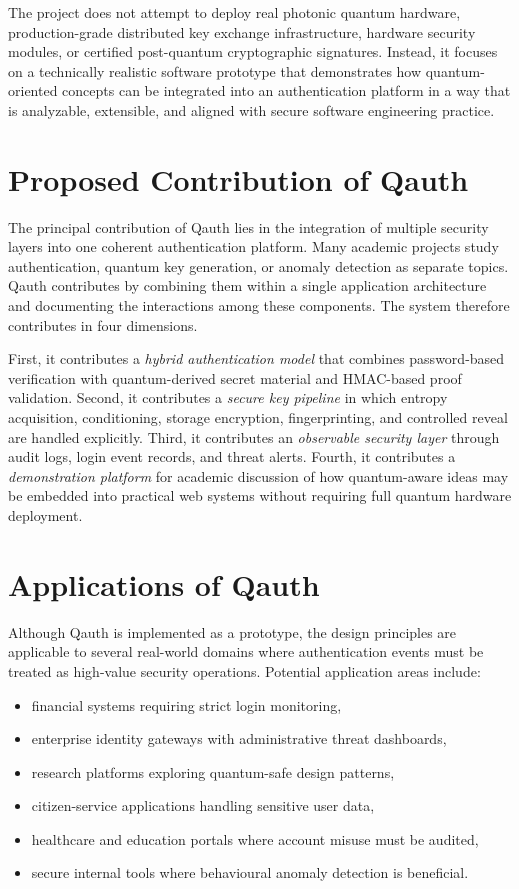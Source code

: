 The project does not attempt to deploy real photonic quantum hardware, production-grade distributed key exchange infrastructure, hardware security modules, or certified post-quantum cryptographic signatures. Instead, it focuses on a technically realistic software prototype that demonstrates how quantum-oriented concepts can be integrated into an authentication platform in a way that is analyzable, extensible, and aligned with secure software engineering practice.

\section{Proposed Contribution of Qauth}
The principal contribution of Qauth lies in the integration of multiple security layers into one coherent authentication platform. Many academic projects study authentication, quantum key generation, or anomaly detection as separate topics. Qauth contributes by combining them within a single application architecture and documenting the interactions among these components. The system therefore contributes in four dimensions.

First, it contributes a \textit{hybrid authentication model} that combines password-based verification with quantum-derived secret material and HMAC-based proof validation. Second, it contributes a \textit{secure key pipeline} in which entropy acquisition, conditioning, storage encryption, fingerprinting, and controlled reveal are handled explicitly. Third, it contributes an \textit{observable security layer} through audit logs, login event records, and threat alerts. Fourth, it contributes a \textit{demonstration platform} for academic discussion of how quantum-aware ideas may be embedded into practical web systems without requiring full quantum hardware deployment.

\section{Applications of Qauth}
Although Qauth is implemented as a prototype, the design principles are applicable to several real-world domains where authentication events must be treated as high-value security operations. Potential application areas include:

\begin{itemize}
    \item financial systems requiring strict login monitoring,
    \item enterprise identity gateways with administrative threat dashboards,
    \item research platforms exploring quantum-safe design patterns,
    \item citizen-service applications handling sensitive user data,
    \item healthcare and education portals where account misuse must be audited,
    \item secure internal tools where behavioural anomaly detection is beneficial.
\end{itemize}

